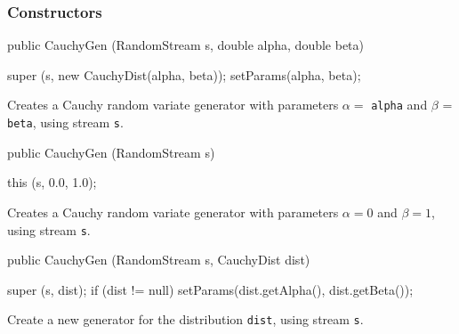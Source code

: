 \subsubsection* {Constructors}
\begin{code}

   public CauchyGen (RandomStream s, double alpha, double beta) \begin{hide} {
      super (s, new CauchyDist(alpha, beta));
      setParams(alpha, beta);
   }\end{hide}
\end{code} 
\begin{tabb} Creates a Cauchy random variate generator with parameters
  $\alpha =$ \texttt{alpha} and $\beta$ = \texttt{beta},
    using stream \texttt{s}. 
\end{tabb}
\begin{code}

   public CauchyGen (RandomStream s) \begin{hide} {
      this (s, 0.0, 1.0);
   }\end{hide}
\end{code} 
\begin{tabb} Creates a Cauchy random variate generator with parameters
  $\alpha =0 $ and $\beta = 1$, using stream \texttt{s}. 
\end{tabb}
\begin{code}

   public CauchyGen (RandomStream s, CauchyDist dist) \begin{hide} {
      super (s, dist);
      if (dist != null)
         setParams(dist.getAlpha(), dist.getBeta());
   }\end{hide}
\end{code}
\begin{tabb} Create a new generator for the distribution \texttt{dist},
     using stream \texttt{s}.
\end{tabb}

